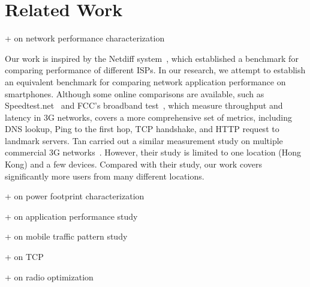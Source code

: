 \chapter{Related Work} \label{chap:related}

+ on network performance characterization

Our work is inspired by the Netdiff system~\cite{Mahajan:NSDI2008:NetDiff},
which established a benchmark for comparing performance of different
ISPs. In our research, we attempt to establish an equivalent benchmark for 
comparing network application performance on smartphones. Although some
online comparisons are available, such as Speedtest.net~\cite{speedtestnet} 
and FCC's broadband test~\cite{fccspeedtest}, which measure throughput and 
latency in 3G networks,  \mobiperf covers a more comprehensive set of 
metrics, including DNS lookup, Ping to the first hop, TCP handshake, and HTTP request to landmark servers.
Tan \etal carried out a similar measurement study on multiple commercial
3G networks~\cite{wltan07}. However, their study is limited to one location
(Hong Kong) and a few devices. Compared with their study, 
our work covers significantly more users from many different locations.


+ on power footprint characterization

+ on application performance study

+ on mobile traffic pattern study

+ on TCP

+ on radio optimization